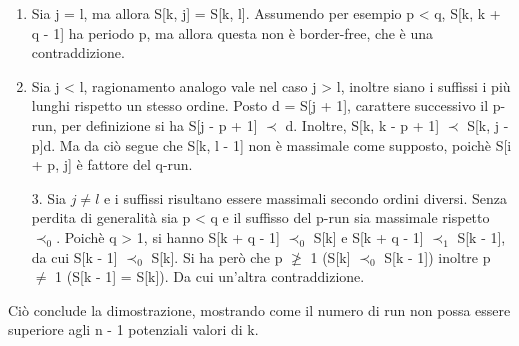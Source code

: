 \documentclass{beamer}
\begin{document}
    \begin{frame}
        \begin{enumerate}
            \item Sia j = l, ma allora S[k, j] = S[k, l].
                Assumendo per esempio p < q, S[k, k + q - 1] ha periodo p,
                ma allora questa non è border-free, che è una contraddizione.

            \item Sia j < l, ragionamento analogo vale nel caso j > l, 
                inoltre siano i suffissi i più lunghi rispetto un stesso ordine.
                Posto d = S[j + 1], carattere successivo il p-run, 
                per definizione si ha S[j - p + 1] \(\prec\) d. 
                Inoltre, S[k, k - p + 1] \(\prec\) S[k, j - p]d. 
                Ma da ciò segue che S[k, l - 1] non è massimale come supposto,
                poichè S[i + p, j] è fattore del q-run.
        \end{enumerate}
    \end{frame}
    \begin{frame}
        \begin{enumerate}
            \item [3.] Sia \(j \ne l\) e i suffissi risultano essere massimali secondo ordini diversi.
                Senza perdita di generalità sia p < q e il suffisso del p-run
                sia massimale rispetto \(\prec_{0}\).
                Poichè q > 1, si hanno S[k + q - 1] \(\prec_{0}\) S[k] e 
                S[k + q - 1] \(\prec_{1}\) S[k  - 1], da cui S[k - 1] \(\prec_{0}\) S[k].
                Si ha però che p \(\not\ge\) 1 (S[k] \(\prec_{0}\) S[k - 1]) 
                inoltre p \(\ne\) 1 (S[k - 1] = S[k]). Da cui un'altra contraddizione.
        \end{enumerate}

        Ciò conclude la dimostrazione, 
        mostrando come il numero di run non possa essere superiore agli n - 1 
        potenziali valori di k.
    \end{frame}
\end{document}

